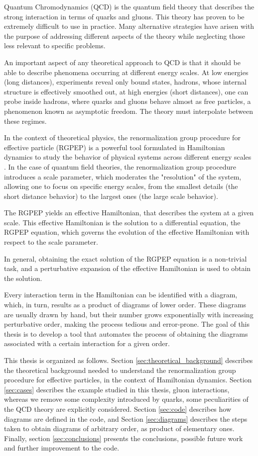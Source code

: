 \documentclass[11pt,a4paper,twoside,pdf]{article}
\numberwithin{equation}{section}
\begin{document}
Quantum Chromodynamics (QCD) is the quantum field theory that describes the strong interaction
in terms of quarks and gluons. This theory has proven to be extremely difficult to use in practice.
Many alternative strategies have arisen with the purpose of addressing different aspects
of the theory while neglecting those less relevant to specific problems.

An important aspect of any theoretical approach to QCD is that it should be able to describe  
phenomena occurring at different energy scales. At low energies (long distances), experiments reveal only bound states,
hadrons, whose internal structure is effectively smoothed out, at high energies 
(short distances), one can probe inside hadrons, where quarks and gluons behave almost as 
free particles, a phenomenon known as asymptotic freedom. The theory must interpolate between these regimes.

In the context of theoretical physics, the renormalization group procedure 
for effective particle (RGPEP) is a powerful tool formulated in Hamiltonian dynamics
to study the behavior of physical systems across different energy scales \cite{PhysRevD.48.5863}.
In the case of quantum field theories, 
the renormalization 
group procedure introduces a scale parameter, which moderates the "resolution" of the 
system, allowing one to focus on specific energy scales, from 
the smallest details (the short distance behavior) to the largest ones (the large
scale behavior). 

The RGPEP yields an effective Hamiltonian, that describes the system at a
given scale. This effective Hamiltonian is the solution to a differential equation,
the RGPEP equation, which governs the evolution of the effective Hamiltonian with 
respect to the scale parameter.

In general, obtaining the exact solution of the RGPEP equation is a non-trivial task, 
and a perturbative expansion of the effective Hamiltonian is used to obtain the 
solution. 

Every interaction term in the Hamiltonian can be identified with a 
diagram, which, in turn, results as a product of diagrams of lower order.
These diagrams are usually drawn by hand, but their number grows exponentially with 
increasing perturbative order, making the process 
tedious and error-prone. The goal of this thesis is to develop a tool that automates 
the process of obtaining the diagrams associated with a certain interaction for a 
given order.

This thesis is organized as follows. Section \ref{sec:theoretical_background} describes
the theoretical background needed to understand the renormalization group procedure
for effective particles, in the context of Hamiltonian dynamics. Section \ref{sec:cases}
describes the example studied in this thesis, gluon interactions, whereas we remove
some complexity introduced by quarks, some peculiarities of the QCD theory are 
explicitly considered. Section \ref{sec:code} describes how diagrams are defined in the code, 
and Section \ref{sec:diagrams} describes the steps taken to obtain diagrams of arbitrary order,
as product of elementary ones. Finally, 
section \ref{sec:conclusions} presents the conclusions, possible future work and 
further improvement to the code.
\end{document}
